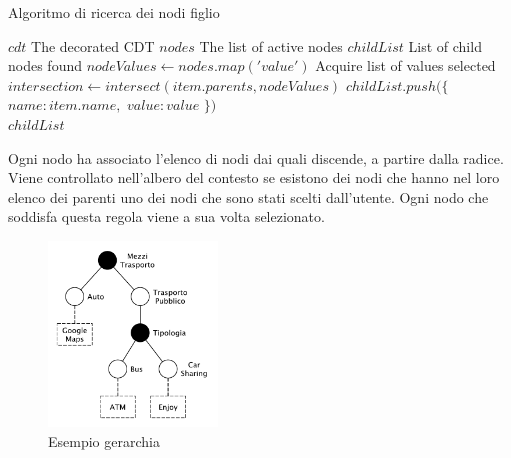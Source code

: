 \begin{algorithm}
	\caption{Algoritmo di ricerca dei nodi figlio}
	\label{alg:algoritmo-ricerca-nodi-figlio}
	\begin{algorithmic}
		\Require
		\Statex $cdt$ \Comment The decorated CDT
		\Statex $nodes$ \Comment The list of active nodes
		\Ensure
		\Statex $childList$ \Comment List of child nodes found
		\Statex
		\State $nodeValues \gets nodes.map('value')$ \Comment Acquire list of values selected
		\State $ intersection \gets intersect(item.parents, nodeValues) $
		\State $ childList.push(\{ $
		\State\hspace{\algorithmicindent} $ name: item.name, $
		\State\hspace{\algorithmicindent} $ value: value $
		\State $ \}) $
		\EndFor
		\EndIf
		\EndFor\\
		\Return $ childList $
	\end{algorithmic}
\end{algorithm}

Ogni nodo ha associato l'elenco di nodi dai quali discende, a partire dalla radice. Viene controllato nell'albero del contesto se esistono dei nodi che hanno nel loro elenco dei parenti uno dei nodi che sono stati scelti dall'utente. Ogni nodo che soddisfa questa regola viene a sua volta selezionato.

\begin{figure}[ht]
	\centering
	\includegraphics[width=0.4\textwidth]{3-metodologia-camus/Immagini/esempio-gerarchia.pdf}
	\caption{Esempio gerarchia}\label{fig:esempio-gerarchia}
\end{figure}

